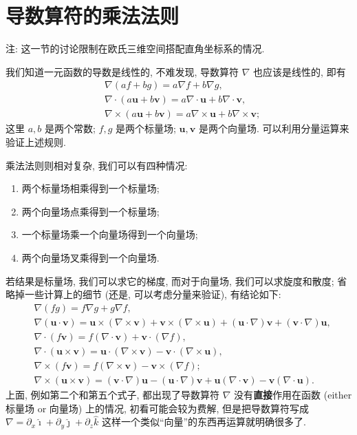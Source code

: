 \section{导数算符的乘法法则}\label{029}

\begin{newquote}
注: 这一节的讨论限制在欧氏三维空间搭配直角坐标系的情况.
\end{newquote}

我们知道一元函数的导数是线性的, 不难发现, 导数算符 $\nabla$
也应该是线性的, 即有 \[
\begin{aligned}
&\nabla(af+bg)=a\nabla f+b\nabla g,\\
&\nabla\cdot(a\boldsymbol{u}+b\boldsymbol{v})=a\nabla\cdot\boldsymbol{u}+b\nabla\cdot\boldsymbol{v},\\
&\nabla\times(a\boldsymbol{u}+b\boldsymbol{v})=a\nabla\times\boldsymbol{u}+b\nabla\times \boldsymbol{v};
\end{aligned}
\] 这里 $a,b$ 是两个常数; $f,g$ 是两个标量场;
$\boldsymbol{u},\boldsymbol{v}$ 是两个向量场.
可以利用分量运算来验证上述规则.

乘法法则则相对复杂, 我们可以有四种情况:

\begin{enumerate}
\def\labelenumi{\arabic{enumi}.}

\item
  两个标量场相乘得到一个标量场;
\item
  两个向量场点乘得到一个标量场;
\item
  一个标量场乘一个向量场得到一个向量场;
\item
  两个向量场叉乘得到一个向量场.
\end{enumerate}

若结果是标量场, 我们可以求它的梯度, 而对于向量场, 我们可以求旋度和散度;
省略掉一些计算上的细节 (还是, 可以考虑分量来验证), 有结论如下: \[
\boxed{\begin{aligned}
&\nabla(fg)=f\nabla g+g\nabla f,\\
&\nabla(\boldsymbol{u}\cdot\boldsymbol{v})=\boldsymbol{u}\times(\nabla\times\boldsymbol{v})+\boldsymbol{v}\times(\nabla\times\boldsymbol{u})+(\boldsymbol{u}\cdot \nabla)\boldsymbol{v}+(\boldsymbol{v}\cdot \nabla)\boldsymbol{u},\\
&\nabla\cdot(f\boldsymbol{v})=f(\nabla\cdot\boldsymbol{v})+\boldsymbol{v}\cdot(\nabla f),\\
&\nabla\cdot(\boldsymbol{u}\times\boldsymbol{v})=\boldsymbol{u}\cdot(\nabla\times\boldsymbol{v})-\boldsymbol{v}\cdot(\nabla\times\boldsymbol{u}),\\
&\nabla\times(f\boldsymbol{v})=f(\nabla\times\boldsymbol{v})-\boldsymbol{v}\times(\nabla f);\\
&\nabla\times(\boldsymbol{u}\times\boldsymbol{v})=(\boldsymbol{v}\cdot\nabla)\boldsymbol{u}-(\boldsymbol{u}\cdot\nabla)\boldsymbol{v}+\boldsymbol{u}(
\nabla\cdot\boldsymbol{v})-\boldsymbol{v}(
\nabla\cdot\boldsymbol{u}).
\end{aligned}}
\] 上面, 例如第二个和第五个式子, 都出现了导数算符 $\nabla$
没有\textbf{直接}作用在函数 (either 标量场 or 向量场) 上的情况,
初看可能会较为费解, 但是把导数算符写成
$\nabla=\partial_x\hat{\imath}+\partial_y\hat{\jmath}+\partial_z\hat{k}$
这样一个类似``向量''的东西再运算就明确很多了.

